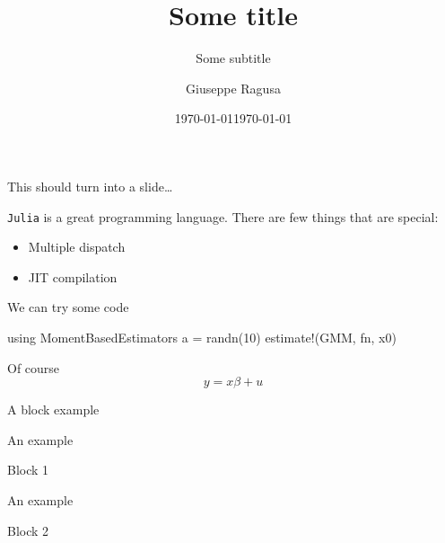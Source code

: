 \documentclass[ignorenonframetext,]{beamer}
\title{Some title}
\subtitle{Some subtitle}
\author{Giuseppe Ragusa}
\date{\today}
\institute{Luiss University - Rome}
\date{\today}
\newenvironment{Shaded}{}{}
\newcommand{\FloatTok}[1]{\textcolor[rgb]{0.50,0.00,0.50}{{#1}}}
\newcommand{\NormalTok}[1]{{#1}}
\providecommand{\tightlist}{%
  \setlength{\itemsep}{0pt}\setlength{\parskip}{0pt}}
\renewenvironment{Shaded}{\begin{snugshade}}{\end{snugshade}}
\begin{document}
\frame{\titlepage}

\begin{frame}{This should turn into a slide\ldots{}}

\texttt{Julia} is a great programming language. There are few things
that are special:

\begin{itemize}
\tightlist
\item
  Multiple dispatch
\item
  JIT compilation
\end{itemize}

\end{frame}

\begin{frame}[fragile]{We can try some code}

\begin{Shaded}
\begin{Highlighting}[numbers=left,,]
\NormalTok{using MomentBasedEstimators}
\NormalTok{a = randn(}\FloatTok{10}\NormalTok{)}
\NormalTok{estimate!(GMM, fn, x0)}
\end{Highlighting}
\end{Shaded}

Of course \[
y=x\beta + u
\]

\end{frame}

\begin{frame}{A block example}

\begin{block}{An example}

Block 1

\end{block}

\begin{block}{An example}

Block 2

\end{block}

\end{frame}
\end{document}
